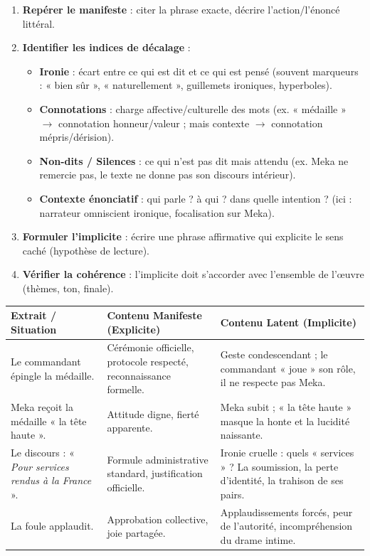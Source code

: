 \documentclass[11pt]{article}
\begin{document}
\begin{methode}
\begin{enumerate}
    \item \textbf{Repérer le manifeste} : citer la phrase exacte, décrire l'action/l'énoncé littéral.
    \item \textbf{Identifier les indices de décalage} : 
    \begin{itemize}
        \item \textbf{Ironie} : écart entre ce qui est dit et ce qui est pensé (souvent marqueurs : « bien sûr », « naturellement », guillemets ironiques, hyperboles).
        \item \textbf{Connotations} : charge affective/culturelle des mots (ex. « médaille » $\rightarrow$ connotation honneur/valeur ; mais contexte $\rightarrow$ connotation mépris/dérision).
        \item \textbf{Non-dits / Silences} : ce qui n'est pas dit mais attendu (ex. Meka ne remercie pas, le texte ne donne pas son discours intérieur).
        \item \textbf{Contexte énonciatif} : qui parle ? à qui ? dans quelle intention ? (ici : narrateur omniscient ironique, focalisation sur Meka).
    \end{itemize}
    \item \textbf{Formuler l'implicite} : écrire une phrase affirmative qui explicite le sens caché (hypothèse de lecture).
    \item \textbf{Vérifier la cohérence} : l'implicite doit s'accorder avec l'ensemble de l'œuvre (thèmes, ton, finale).
\end{enumerate}
\end{methode}

\begin{exemplebox}
\begin{center}
\begin{tabularx}{\linewidth}{|l|X|X|}
\hline
\rowcolor{popblueL}
\textbf{Extrait / Situation} & \textbf{Contenu Manifeste (Explicite)} & \textbf{Contenu Latent (Implicite)} \\ \hline
Le commandant épingle la médaille. & Cérémonie officielle, protocole respecté, reconnaissance formelle. & Geste condescendant ; le commandant « joue » son rôle, il ne respecte pas Meka. \\ \hline
Meka reçoit la médaille « la tête haute ». & Attitude digne, fierté apparente. & Meka subit ; « la tête haute » masque la honte et la lucidité naissante. \\ \hline
Le discours : « \emph{Pour services rendus à la France} ». & Formule administrative standard, justification officielle. & Ironie cruelle : quels « services » ? La soumission, la perte d'identité, la trahison de ses pairs. \\ \hline
La foule applaudit. & Approbation collective, joie partagée. & Applaudissements forcés, peur de l'autorité, incompréhension du drame intime. \\ \hline
\end{tabularx}
\end{center}
\end{exemplebox}
\end{document}
